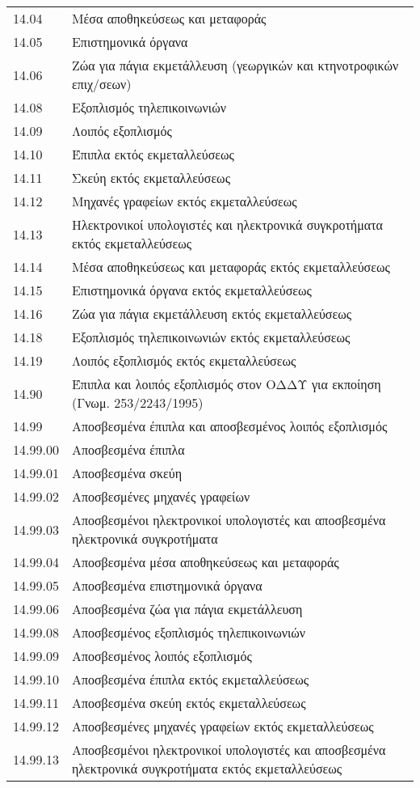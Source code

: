 \documentclass[A4,10pt,greek]{book}
\begin{document}
\begin{tabularx}{\linewidth}{lX}
14.04 & Μέσα αποθηκεύσεως και μεταφοράς\\
14.05 & Επιστημονικά όργανα\\
14.06 & Ζώα για πάγια εκμετάλλευση (γεωργικών και κτηνοτροφικών επιχ/σεων)\\
14.08 & Εξοπλισμός τηλεπικοινωνιών\\
14.09 & Λοιπός εξοπλισμός\\
14.10 & Έπιπλα εκτός εκμεταλλεύσεως\\
14.11 & Σκεύη εκτός εκμεταλλεύσεως\\
14.12 & Μηχανές γραφείων εκτός εκμεταλλεύσεως\\
14.13 & Ηλεκτρονικοί υπολογιστές και ηλεκτρονικά συγκροτήματα εκτός εκμεταλλεύσεως\\
14.14 & Μέσα αποθηκεύσεως και μεταφοράς εκτός εκμεταλλεύσεως\\
14.15 & Επιστημονικά όργανα εκτός εκμεταλλεύσεως\\
14.16 & Ζώα για πάγια εκμετάλλευση εκτός εκμεταλλεύσεως\\
14.18 & Εξοπλισμός τηλεπικοινωνιών εκτός εκμεταλλεύσεως\\
14.19 & Λοιπός εξοπλισμός εκτός εκμεταλλεύσεως\\
14.90 & Έπιπλα και λοιπός εξοπλισμός στον ΟΔΔΥ για εκποίηση (Γνωμ. 253/2243/1995)\\
14.99 & Αποσβεσμένα έπιπλα και αποσβεσμένος λοιπός εξοπλισμός\\
14.99.00 & Αποσβεσμένα έπιπλα\\
14.99.01 & Αποσβεσμένα σκεύη\\
14.99.02 & Αποσβεσμένες μηχανές γραφείων\\
14.99.03 & Αποσβεσμένοι ηλεκτρονικοί υπολογιστές και αποσβεσμένα ηλεκτρονικά συγκροτήματα\\
14.99.04 & Αποσβεσμένα μέσα αποθηκεύσεως και μεταφοράς\\
14.99.05 & Αποσβεσμένα επιστημονικά όργανα\\
14.99.06 & Αποσβεσμένα ζώα για πάγια εκμετάλλευση\\
14.99.08 & Αποσβεσμένος εξοπλισμός τηλεπικοινωνιών\\
14.99.09 & Αποσβεσμένος λοιπός εξοπλισμός\\
14.99.10 & Αποσβεσμένα έπιπλα εκτός εκμεταλλεύσεως\\
14.99.11 & Αποσβεσμένα σκεύη εκτός εκμεταλλεύσεως\\
14.99.12 & Αποσβεσμένες μηχανές γραφείων εκτός εκμεταλλεύσεως\\
14.99.13 & Αποσβεσμένοι ηλεκτρονικοί υπολογιστές και αποσβεσμένα ηλεκτρονικά συγκροτήματα εκτός εκμεταλλεύσεως\\

\end{tabularx}
\end{document}
